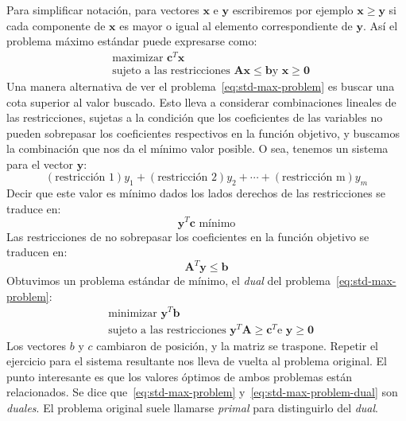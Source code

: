   Para simplificar notación,
  para vectores \(\mathbf{x}\) e \(\mathbf{y}\)
  escribiremos por ejemplo \(\mathbf{x} \ge \mathbf{y}\)
  si cada componente de \(\mathbf{x}\)
  es mayor o igual al elemento correspondiente de \(\mathbf{y}\).
  Así el problema máximo estándar puede expresarse como:
  \begin{equation}
    \label{eq:std-max-problem}
    \begin{aligned}
      &\text{maximizar \(\mathbf{c}^T \mathbf{x}\)} \\
      &\text{sujeto a las restricciones
               \(\mathbf{A} \mathbf{x} \le \mathbf{b}\)
               y \(\mathbf{x} \ge \mathbf{0}\)}
    \end{aligned}
  \end{equation}
  Una manera alternativa de ver el problema~\ref{eq:std-max-problem}
  es buscar una cota superior al valor buscado.
  Esto lleva a considerar combinaciones lineales de las restricciones,
  sujetas a la condición
  que los coeficientes de las variables
  no pueden sobrepasar los coeficientes respectivos en la función objetivo,
  y buscamos la combinación que nos da el mínimo valor posible.
  O sea,
  tenemos un sistema para el vector \(\mathbf{y}\):
  \begin{equation*}
    (\text{restricción 1}) y_1 + (\text{restricción 2}) y_2
      + \dotsb + (\text{restricción m}) y_m
  \end{equation*}
  Decir que este valor es mínimo dados los lados derechos de las restricciones
  se traduce en:
  \begin{equation*}
    \mathbf{y}^T \mathbf{c} \text{\ mínimo}
  \end{equation*}
  Las restricciones de no sobrepasar los coeficientes en la función objetivo
  se traducen en:
  \begin{equation*}
    \mathbf{A}^T \mathbf{y} \le \mathbf{b}
  \end{equation*}
  Obtuvimos un problema estándar de mínimo,
  el \emph{dual} del problema~\eqref{eq:std-max-problem}:
  \begin{equation}
    \label{eq:std-max-problem-dual}
    \begin{aligned}
      &\text{minimizar \(\mathbf{y}^T \mathbf{b}\)} \\
      &\text{sujeto a las restricciones
               \(\mathbf{y}^T \mathbf{A} \ge \mathbf{c}^T\)
               e \(\mathbf{y} \ge \mathbf{0}\)}
    \end{aligned}
  \end{equation}
  Los vectores \(b\) y \(c\) cambiaron de posición,
  y la matriz se traspone.
  Repetir el ejercicio para el sistema resultante
  nos lleva de vuelta al problema original.
  El punto interesante es que los valores óptimos de ambos problemas
  están relacionados.
  Se dice que~\eqref{eq:std-max-problem} y~\eqref{eq:std-max-problem-dual}
  son \emph{duales}.
  El problema original suele llamarse \emph{primal}
  para distinguirlo del \emph{dual}.

